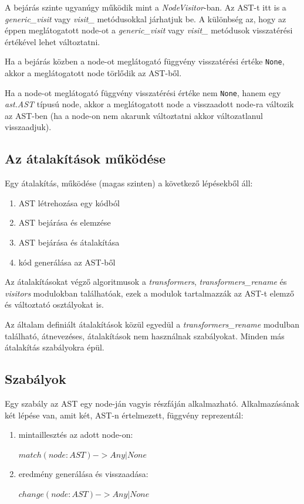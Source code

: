 A bejárás szinte ugyanúgy működik mint a \emph{NodeVisitor}-ban.
Az AST-t itt is a \emph{generic\_visit} vagy \emph{visit\_<node-class>} metódusokkal
járhatjuk be.
A különbség az, hogy az éppen meglátogatott node-ot a
\emph{generic\_visit} vagy \emph{visit\_<node-class>}
metódusok visszatérési értékével lehet változtatni. 

Ha a bejárás közben a node-ot meglátogató függvény visszatérési értéke \texttt{None},
akkor a meglátogatott node törlődik az AST-ből.

Ha a node-ot meglátogató függvény visszatérési értéke nem \texttt{None},
hanem egy \emph{ast.AST} típusú node,
akkor a meglátogatott node a visszaadott node-ra változik az AST-ben
(ha a node-on nem akarunk változtatni akkor változatlanul visszaadjuk).

\subsection{Az átalakítások működése}

Egy átalakítás, működése (magas szinten) a következő lépésekből áll:

\begin{enumerate}
	\item AST létrehozása egy kódból
	\item AST bejárása és elemzése
	\item AST bejárása és átalakítása
	\item kód generálása az AST-ből
\end{enumerate}

Az átalakításokat végző algoritmusok a \emph{transformers}, \emph{transformers\_rename}
és \emph{visitors} modulokban találhatóak, ezek a modulok tartalmazzák az AST-t
elemző és változtató osztályokat is.

Az általam definiált átalakítások közül egyedül
a \emph{transformers\_rename} modulban található, átnevezéses,
átalakítások nem használnak szabályokat.
Minden más átalakítás szabályokra épül.

\subsection{Szabályok}

Egy szabály az AST egy node-ján vagyis részfáján alkalmazható.
Alkalmazásának két lépése van, amit két, AST-n értelmezett, függvény reprezentál:

\begin{enumerate}
	\item mintaillesztés az adott node-on:
	
	\(match(node: AST) -> Any | None \)
	
	\item eredmény generálása és visszaadása:
	
	\(change(node: AST) -> Any | None \)
\end{enumerate}

